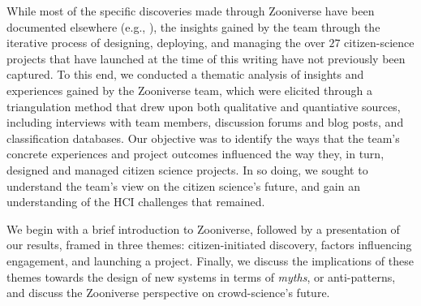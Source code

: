 \documentclass{sigchi}
\begin{document}
While most of the specific discoveries made through Zooniverse have been documented elsewhere (e.g., \cite{lintott2008galaxy,lintott2009galaxy,story-of-the-peas,simpson2013dynamic}), the insights gained by the team through the iterative process of designing, deploying, and managing the over $27$ citizen-science projects that have launched at the time of this writing have not previously been captured. To this end, we conducted a thematic analysis of insights and experiences gained by the Zooniverse team, which were elicited through a triangulation method that drew upon both qualitative and quantiative sources, including interviews with team members, discussion forums and blog posts, and classification databases.  Our objective was to identify the ways that the team's concrete experiences and project outcomes influenced the way they, in turn, designed and managed citizen science projects.  In so doing, we sought to understand the team's view on the citizen science's future, and gain an understanding of the HCI challenges that remained.


We begin with a brief introduction to Zooniverse, followed by a presentation of our results, framed in three themes: citizen-initiated discovery, factors influencing engagement, and launching a project.  Finally, we discuss the implications of these themes towards the design of new systems in terms of \emph{myths}, or anti-patterns, and discuss the Zooniverse perspective on crowd-science's future.

\end{document}
